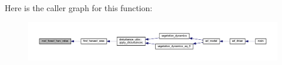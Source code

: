 Here is the caller graph for this function\+:\nopagebreak
\begin{figure}[H]
\begin{center}
\leavevmode
\includegraphics[width=350pt]{forestry_8f90_a898715995f682282189cfebd9d1fc175_icgraph}
\end{center}
\end{figure}


